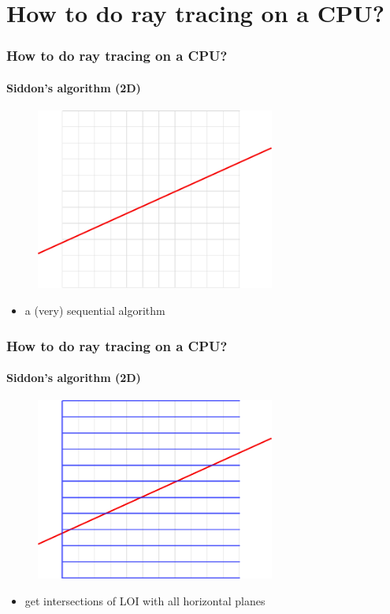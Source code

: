 \documentclass{beamer}
\begin{document}
\section{How to do ray tracing on a CPU?}
\begin{frame}
  \frametitle{How to do ray tracing on a CPU?}
  \framesubtitle{Siddon's algorithm (2D)}
  \begin{figure}
    \centering
    \includegraphics[width = 0.7\textwidth]{../Siddon.pdf}
  \end{figure}
  \begin{itemize}
    \item a (very) sequential algorithm
  \end{itemize}
\end{frame}

\begin{frame}
  \frametitle{How to do ray tracing on a CPU?}
  \framesubtitle{Siddon's algorithm (2D)}
  \begin{figure}
    \centering
    \includegraphics[width = 0.7\textwidth]{../Horizontal.pdf}
  \end{figure}
  \begin{itemize}
    \item get intersections of LOI with all horizontal planes
  \end{itemize}
\end{frame}
\end{document}
